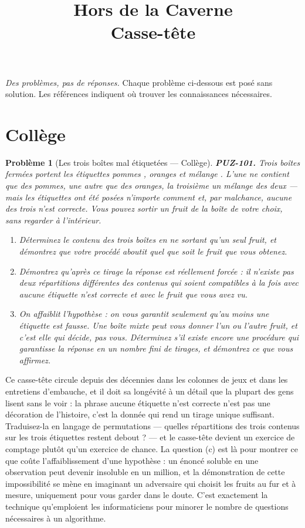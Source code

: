 \documentclass[11pt]{article}
\title{Hors de la Caverne \\ \Large Casse-tête}
\author{}
\date{}
\newtheorem{problem}{Problème}
\begin{document}
\maketitle
\noindent\emph{Des problèmes, pas de réponses.} Chaque problème ci-dessous est posé
sans solution. Les références indiquent où trouver les connaissances nécessaires.
\medskip


\section*{Collège}

\begin{problem}[{Les trois boîtes mal étiquetées --- Collège}]
\textbf{PUZ-101.} Trois boîtes fermées portent les étiquettes \og{} pommes \fg{}, \og{} oranges \fg{} et
\og{} mélange \fg{}. L'une ne contient que des pommes, une autre que des oranges, la troisième un
mélange des deux --- mais les étiquettes ont été posées n'importe comment et, par malchance,
aucune des trois n'est correcte. Vous pouvez sortir un fruit de la boîte de votre choix, sans
regarder à l'intérieur.
\begin{enumerate}
\item[(a)] Déterminez le contenu des trois boîtes en ne sortant qu'un seul fruit, et démontrez que
votre procédé aboutit quel que soit le fruit que vous obtenez.
\item[(b)] Démontrez qu'après ce tirage la réponse est réellement forcée : il n'existe pas deux
répartitions différentes des contenus qui soient compatibles à la fois avec \og{} aucune
étiquette n'est correcte \fg{} et avec le fruit que vous avez vu.
\item[(c)] On affaiblit l'hypothèse : on vous garantit seulement qu'\textit{au moins} une étiquette est
fausse. Une boîte mixte peut vous donner l'un ou l'autre fruit, et c'est elle qui décide,
pas vous. Déterminez s'il existe encore une procédure qui garantisse la réponse en un nombre
fini de tirages, et démontrez ce que vous affirmez.
\end{enumerate}

\end{problem}

\noindent Ce casse-tête circule depuis des décennies dans les colonnes de jeux et
dans les entretiens d'embauche, et il doit sa longévité à un détail que la plupart des gens
lisent sans le voir : la phrase \og{} aucune étiquette n'est correcte \fg{} n'est pas une décoration
de l'histoire, c'est la donnée qui rend un tirage unique suffisant. Traduisez-la en langage de
permutations --- quelles répartitions des trois contenus sur les trois étiquettes restent
debout ? --- et le casse-tête devient un exercice de comptage plutôt qu'un exercice de chance.
La question (c) est là pour montrer ce que coûte l'affaiblissement d'une hypothèse : un énoncé
soluble en une observation peut devenir insoluble en un million, et la démonstration de cette
impossibilité se mène en imaginant un adversaire qui choisit les fruits au fur et à mesure,
uniquement pour vous garder dans le doute. C'est exactement la technique qu'emploient les
informaticiens pour minorer le nombre de questions nécessaires à un algorithme.
\end{document}
